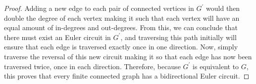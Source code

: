 \documentclass[11pt]{article}
\begin{document}
\begin{proof}
	Adding a new edge to each pair of connected vertices in $G^{\prime}$ would then double the degree of each vertex making it such that each vertex will have an equal amount of in-degrees and out-degrees. From this, we can conclude that there must exist an Euler circuit in $G^{\prime}$, and traversing this path initially will ensure that each edge is traversed exactly once in one direction. Now, simply traverse the reversal of this new circuit making it so that each edge has now been traversed twice, once in each direction. Therefore, because $G^{\prime}$ is equivalent to $G$, this proves that every finite connected graph has a bidirectional Euler circuit.
\end{proof}















	
\end{document}
